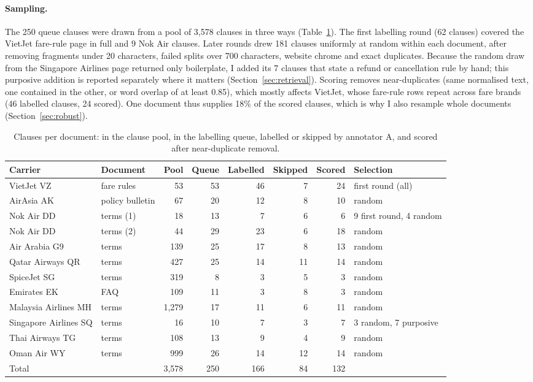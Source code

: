 \documentclass[11pt,a4paper]{article}
\begin{document}
\paragraph{Sampling.} The 250 queue clauses were drawn from a pool of 3,578 clauses in three ways (Table~\ref{tab:sources}). The first labelling round (62 clauses) covered the VietJet fare-rule page in full and 9 Nok Air clauses. Later rounds drew 181 clauses uniformly at random within each document, after removing fragments under 20 characters, failed splits over 700 characters, website chrome and exact duplicates. Because the random draw from the Singapore Airlines page returned only boilerplate, I added its 7 clauses that state a refund or cancellation rule by hand; this purposive addition is reported separately where it matters (Section~\ref{sec:retrieval}). Scoring removes near-duplicates (same normalised text, one contained in the other, or word overlap of at least 0.85), which mostly affects VietJet, whose fare-rule rows repeat across fare brands (46 labelled clauses, 24 scored). One document thus supplies 18\% of the scored clauses, which is why I also resample whole documents (Section~\ref{sec:robust}).

\begin{table}[h]
\centering
\footnotesize
\setlength{\tabcolsep}{4pt}
\begin{tabular}{llrrrrrl}
\toprule
Carrier & Document & Pool & Queue & Labelled & Skipped & Scored & Selection \\
\midrule
VietJet VZ & fare rules & 53 & 53 & 46 & 7 & 24 & first round (all) \\
AirAsia AK & policy bulletin & 67 & 20 & 12 & 8 & 10 & random \\
Nok Air DD & terms (1) & 18 & 13 & 7 & 6 & 6 & 9 first round, 4 random \\
Nok Air DD & terms (2) & 44 & 29 & 23 & 6 & 18 & random \\
Air Arabia G9 & terms & 139 & 25 & 17 & 8 & 13 & random \\
Qatar Airways QR & terms & 427 & 25 & 14 & 11 & 14 & random \\
SpiceJet SG & terms & 319 & 8 & 3 & 5 & 3 & random \\
Emirates EK & FAQ & 109 & 11 & 3 & 8 & 3 & random \\
Malaysia Airlines MH & terms & 1,279 & 17 & 11 & 6 & 11 & random \\
Singapore Airlines SQ & terms & 16 & 10 & 7 & 3 & 7 & 3 random, 7 purposive \\
Thai Airways TG & terms & 108 & 13 & 9 & 4 & 9 & random \\
Oman Air WY & terms & 999 & 26 & 14 & 12 & 14 & random \\
\midrule
Total & & 3,578 & 250 & 166 & 84 & 132 & \\
\bottomrule
\end{tabular}
\caption{Clauses per document: in the clause pool, in the labelling queue, labelled or skipped by annotator A, and scored after near-duplicate removal.}
\label{tab:sources}
\end{table}
\end{document}
